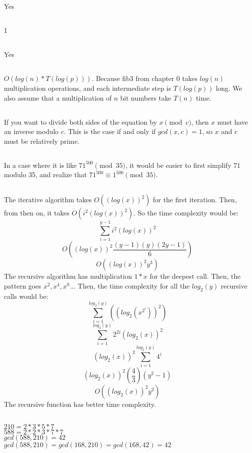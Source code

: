 \documentclass{article}
\begin{document}
\subsection{}Yes
\subsection{}1
\subsection{}Yes
\subsection{}
$O(log(n)*T(log(p)))$. Because fib3 from chapter 0 takes $log(n)$ multiplication operations, and each intermediate step is $T(log(p))$ long. We also assume that a multiplication of $n$ bit numbers take $T(n)$ time.
\subsection{}If you want to divide both sides of the equation by $x\pmod c$, then $x$ must have an inverse modulo $c$. This is the case if and only if $gcd(x,c)=1$, so $x$ and $c$ must be relatively prime.  
\subsection{}In a case where it is like $71^{500} \pmod {35}$, it would be easier to first simplify 71 modulo 35, and realize that $71^{500} \equiv 1^{500} \pmod {35}$. 
\subsection{}The iterative algorithm takes $O((log(x))^2)$ for the first iteration. Then, from then on, it takes $O(i^2(log(x))^2)$. So the time complexity would be:
$$\sum_{i=1}^{y-1}i^2(log(x))^2$$
$$O((log(x))^2\frac{(y-1)(y)(2y-1)}{6})$$
$$O((log(x))^2y^3)$$
The recursive algorithm has multiplication $1*x$ for the deepest call. Then, the pattern goes $x^2, x^4, x^8...$ Then, the time complexity for all the $log_2(y)$ recursive calls would be:
$$\sum_{i=1}^{log_2(y)}((log_2(x^{2^i}))^2)$$
$$\sum_{i=1}^{log_2(y)}2^{2i}(log_2(x))^2$$
$$(log_2(x))^2\sum_{i=1}^{log_2(y)}4^{i}$$
$$(log_2(x))^2(\frac{4}{3})(y^2-1)$$
$$O((log_2(x))^2y^2)$$
The recursive function has better time complexity. 
\subsection{}$210=2*3*5*7$\\
$588=2*2*3*7*7$\\
$gcd(588,210)=42$\\
$gcd(588,210)=gcd(168,210)=gcd(168,42)=42$
\end{document}
